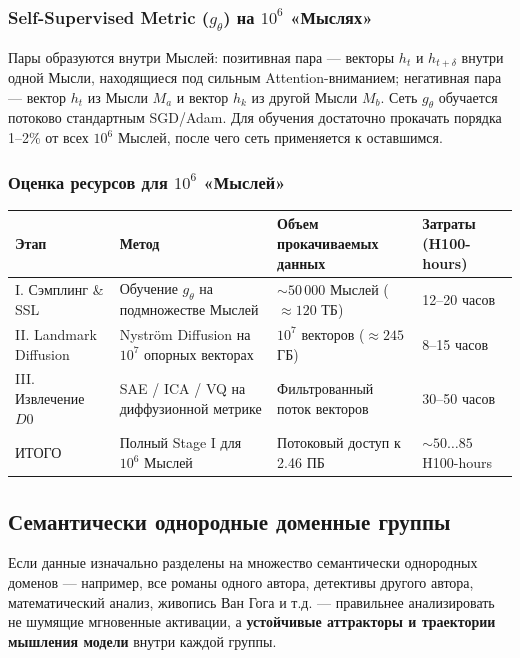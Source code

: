 \documentclass[11pt,a4paper]{article}
\begin{document}
\subsubsection*{Self-Supervised Metric ($g_\theta$) на $10^6$ «Мыслях»}

Пары образуются внутри Мыслей: позитивная пара — векторы $h_t$ и $h_{t+\delta}$ внутри одной Мысли, находящиеся под сильным Attention-вниманием; негативная пара — вектор $h_t$ из Мысли $M_a$ и вектор $h_k$ из другой Мысли $M_b$. Сеть $g_\theta$ обучается потоково стандартным SGD/Adam. Для обучения достаточно прокачать порядка 1--2\% от всех $10^6$ Мыслей, после чего сеть применяется к оставшимся.

\subsubsection*{Оценка ресурсов для $10^6$ «Мыслей»}

\begin{table}[h!]
\centering
\small
\begin{tabular}{p{3.0cm} p{5.4cm} p{3.4cm} p{3.0cm}}
\toprule
\textbf{Этап} & \textbf{Метод} & \textbf{Объем прокачиваемых данных} & \textbf{Затраты (H100-hours)} \\
\midrule
I. Сэмплинг \& SSL & Обучение $g_\theta$ на подмножестве Мыслей & $\sim50\,000$ Мыслей ($\approx120$ ТБ) & 12--20 часов \\
II. Landmark Diffusion & Nyström Diffusion на $10^7$ опорных векторах & $10^7$ векторов ($\approx245$ ГБ) & 8--15 часов \\
III. Извлечение $D0$ & SAE / ICA / VQ на диффузионной метрике & Фильтрованный поток векторов & 30--50 часов \\
\midrule
ИТОГО & Полный Stage I для $10^6$ Мыслей & Потоковый доступ к 2.46 ПБ & $\sim50\ldots85$ H100-hours \\
\bottomrule
\end{tabular}
\end{table}

\subsection*{Семантически однородные доменные группы}

Если данные изначально разделены на множество семантически однородных доменов — например, все романы одного автора, детективы другого автора, математический анализ, живопись Ван Гога и т.д. — правильнее анализировать не шумящие мгновенные активации, а \textbf{устойчивые аттракторы и траектории мышления модели} внутри каждой группы.
\end{document}
